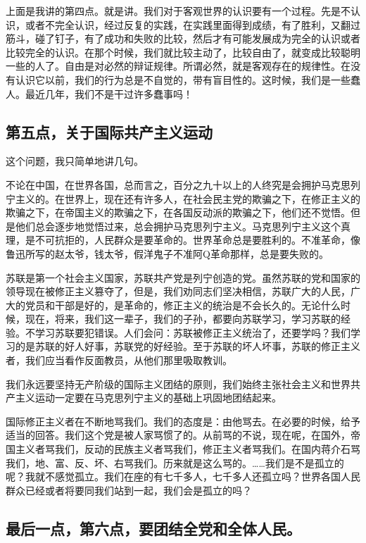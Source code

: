 上面是我讲的第四点。就是讲。我们对于客观世界的认识要有一个过程。先是不认识，或者不完全认识，经过反复的实践，在实践里面得到成绩，有了胜利，又翻过筋斗，碰了钉子，有了成功和失败的比较，然后才有可能发展成为完全的认识或者比较完全的认识。在那个时候，我们就比较主动了，比较自由了，就变成比较聪明一些的人了。自由是对必然的辩证规律。所谓必然，就是客观存在的规律性。在没有认识它以前，我们的行为总是不自觉的，带有盲目性的。这时候，我们是一些蠢人。最近几年，我们不是干过许多蠢事吗！

\subsection{第五点，关于国际共产主义运动}

这个问题，我只简单地讲几句。

不论在中国，在世界各国，总而言之，百分之九十以上的人终究是会拥护马克思列宁主义的。在世界上，现在还有许多人，在社会民主党的欺骗之下，在修正主义的欺骗之下，在帝国主义的欺骗之下，在各国反动派的欺骗之下，他们还不觉悟。但是他们总会逐步地觉悟过来，总会拥护马克思列宁主义。马克思列宁主义这个真理，是不可抗拒的，人民群众是要革命的。世界革命总是要胜利的。不准革命，像鲁迅所写的赵太爷，钱太爷，假洋鬼子不准阿Q革命那样，总是要失败的。

苏联是第一个社会主义国家，苏联共产党是列宁创造的党。虽然苏联的党和国家的领导现在被修正主义篡夺了，但是，我们劝同志们坚决相信，苏联广大的人民，广大的党员和干部是好的，是革命的，修正主义的统治是不会长久的。无论什么时候，现在，将来，我们这一辈子，我们的子孙，都要向苏联学习，学习苏联的经验。不学习苏联要犯错误。人们会问：苏联被修正主义统治了，还要学吗？我们学习的是苏联的好人好事，苏联党的好经验。至于苏联的坏人坏事，苏联的修正主义者，我们应当看作反面教员，从他们那里吸取教训。

我们永远要坚持无产阶级的国际主义团结的原则，我们始终主张社会主义和世界共产主义运动一定要在马克思列宁主义的基础上巩固地团结起来。

国际修正主义者在不断地骂我们。我们的态度是：由他骂去。在必要的时候，给予适当的回答。我们这个党是被人家骂惯了的。从前骂的不说，现在呢，在国外，帝国主义者骂我们，反动的民族主义者骂我们，修正主义者骂我们。在国内蒋介石骂我们，地、富、反、坏、右骂我们。历来就是这么骂的。……我们是不是孤立的呢？我就不感觉孤立。我们在座的有七千多人，七千多人还孤立吗？世界各国人民群众已经或者将要同我们站到一起，我们会是孤立的吗？

\subsection{最后一点，第六点，要团结全党和全体人民。}

